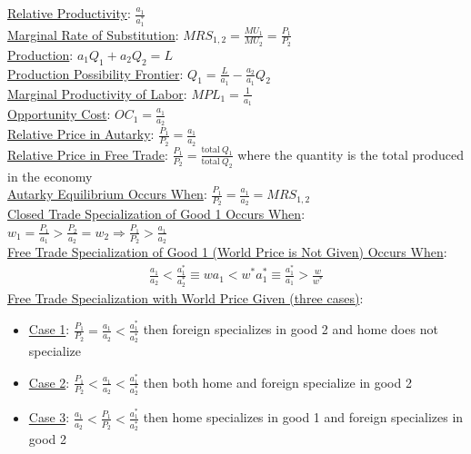 \documentclass{article}
\begin{document}
\underline{Relative Productivity}: $\frac{a_{1}}{a_{1}^{*}}$ \\
\underline{Marginal Rate of Substitution}: $MRS_{1,2} = \frac{MU_{1}}{MU_{2}} = \frac{P_{1}}{P_{2}}$ \\
\underline{Production}: $a_{1}Q_{1} + a_{2}Q_{2} = L$ \\
\underline{Production Possibility Frontier}: $Q_{1} = \frac{L}{a_{1}} - \frac{a_{2}}{a_{1}}Q_{2}$ \\
\underline{Marginal Productivity of Labor}: $MPL_{1} = \frac{1}{a_{1}}$ \\
\underline{Opportunity Cost}: $OC_{1} = \frac{a_{1}}{a_{2}}$ \\
\underline{Relative Price in Autarky}: $\frac{P_{1}}{P_{2}} = \frac{a_{1}}{a_{2}}$ \\
\underline{Relative Price in Free Trade}: $\frac{P_{1}}{P_{2}} = \frac{\text{total} \ Q_{1}}{\text{total} \ Q_{2}}$ where the quantity is the total produced in the economy \\
\underline{Autarky Equilibrium Occurs When}: $\frac{P_{1}}{P_{2}} = \frac{a_{1}}{a_{2}} = MRS_{1,2}$ \\
\underline{Closed Trade Specialization of Good 1 Occurs When}: $w_{1} = \frac{P_{1}}{a_{1}} > \frac{P_{2}}{a_{2}} = w_{2} \Rightarrow \frac{P_{1}}{P_{2}} > \frac{a_{1}}{a_{2}}$ \\
\underline{Free Trade Specialization of Good 1 (World Price is Not Given) Occurs When}:
 \begin{gather*}
   \frac{a_{1}}{a_{2}} < \frac{a_{1}^{*}}{a_{2}^{*}} \equiv wa_{1} < w^{*}a_{1}^{*} \equiv \frac{a_{1}^{*}}{a_{1}} > \frac{w}{w^{*}}
 \end{gather*}
\underline{Free Trade Specialization with World Price Given (three cases)}:
\begin{itemize}
  \item  \underline{Case 1}: $\frac{P_{1}}{P_{2}} = \frac{a_{1}}{a_{2}} < \frac{a_{1}^{*}}{a_{2}^{*}}$ then foreign specializes in good 2 and home does not specialize
  \item  \underline{Case 2}: $\frac{P_{1}}{P_{2}} < \frac{a_{1}}{a_{2}} < \frac{a_{1}^{*}}{a_{2}^{*}}$ then both home and foreign specialize in good 2
  \item  \underline{Case 3}: $\frac{a_{1}}{a_{2}} < \frac{P_{1}}{P_{2}} < \frac{a_{1}^{*}}{a_{2}^{*}}$ then home specializes in good 1 and foreign specializes in good 2
\end{itemize}

\newpage
\end{document}
